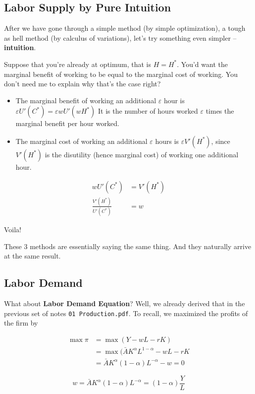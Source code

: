 \documentclass[11pt]{scrartcl}
\newcommand{\ve}{\varepsilon}
\begin{document}
\subsection{Labor Supply by Pure Intuition}
After we have gone through a simple method (by simple optimization), a tough as hell method (by calculus of variations), let's try something even simpler -- \textbf{intuition}.

Suppose that you're already at optimum, that is $H = H^*$. You'd want the marginal benefit of working to be equal to the marginal cost of working. You don't need me to explain why that's the case right?

\begin{itemize}
	\item The marginal benefit of working an additional $\ve$ hour is $\ve U'(C^*) = \ve  w  U'(wH^*)$ It is the number of hours worked $\ve$ times the marginal benefit per hour worked. 
	\item The marginal cost of working an additional $\ve$ hours is $\ve V'(H^*)$, since $V'(H^*)$ is the disutility (hence marginal cost) of working one additional hour.
\end{itemize}

\begin{align*}
wU'(C^*) &= V'(H^*) \\
\frac{V'(H^*)}{U'(C^*)} &= w
\end{align*}

Voila!

These 3 methods are essentially saying the same thing. And they naturally arrive at the same result.

\subsection{Labor Demand}

What about \textbf{Labor Demand Equation}? Well, we already derived that in the previous set of notes \lstinline{01 Production.pdf}. To recall, we maximized the profits of the firm by 

\begin{align*}
\max \pi &= \max (Y - wL - rK) \\
&= \max (\bar{A}K^\alpha L^{1-\alpha} - wL - rK \\
&= \bar{A} K^\alpha (1-\alpha)L^{-\alpha} - w = 0
\end{align*}

\[ w = \bar{A}K^\alpha (1-\alpha)L^{-\alpha} = (1-\alpha) \frac{Y}{L}\]
\end{document}
